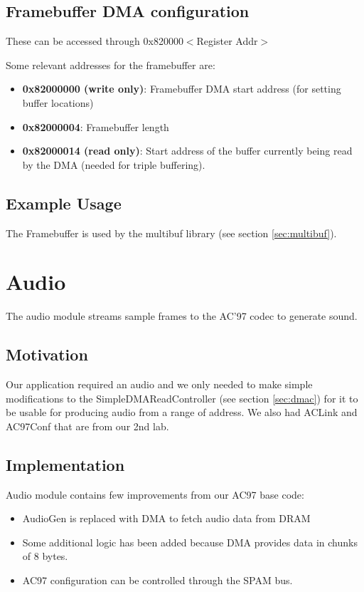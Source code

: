 \documentclass[10pt]{report}
\begin{document}
\subsection{Framebuffer DMA configuration}

These can be accessed through 0x820000$<$Register Addr$>$

Some relevant addresses for the framebuffer are:

\begin{itemize}
\item{\textbf{0x82000000 (write only)}: Framebuffer DMA start address (for setting buffer
locations)}
\item{\textbf{0x82000004}: Framebuffer length}
\item{\textbf{0x82000014 (read only)}: Start address of the buffer currently being read by
the DMA (needed for triple buffering).}
\end{itemize}

\subsection{Example Usage}

The Framebuffer is used by the multibuf library (see section
\ref{sec:multibuf}).

\section{Audio}

\label{sec:audio}

The audio module streams sample frames to the AC'97 codec to generate sound.

\subsection{Motivation}

Our application required an audio and we only needed to make simple
modifications to the SimpleDMAReadController (see section \ref{sec:dmac})
for it to be usable for producing audio from a range of address.  We also
had ACLink and AC97Conf that are from our 2nd lab.

\subsection{Implementation}

Audio module contains few improvements from our AC97 base code:

\begin{itemize}
\item{AudioGen is replaced with DMA to fetch audio data from DRAM}
\item{Some additional logic has been added because DMA provides data in
chunks of 8 bytes.}
\item{AC97 configuration can be controlled through the SPAM bus.}
\end{itemize}
\end{document}
